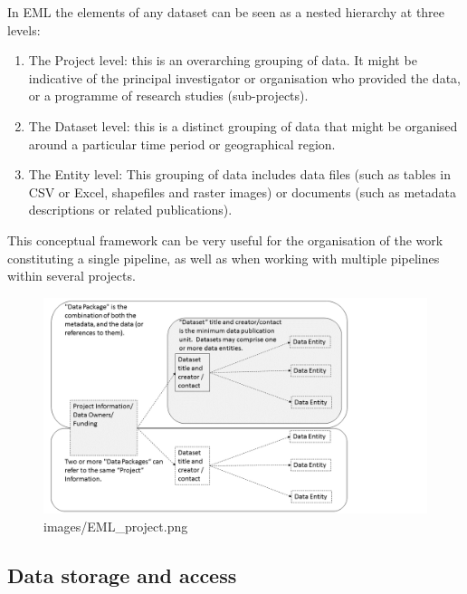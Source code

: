 \documentclass[11pt,a4paper]{article}
\begin{document}
In EML the elements of any dataset can be seen as a nested hierarchy at
three levels:

\begin{enumerate}
\def\labelenumi{\arabic{enumi}.}
\itemsep1pt\parskip0pt
\item
  The Project level: this is an overarching grouping of data. It might
  be indicative of the principal investigator or organisation who
  provided the data, or a programme of research studies (sub-projects).
\item
  The Dataset level: this is a distinct grouping of data that might be
  organised around a particular time period or geographical region.
\item
  The Entity level: This grouping of data includes data files (such as
  tables in CSV or Excel, shapefiles and raster images) or documents
  (such as metadata descriptions or related publications).
\end{enumerate}

This conceptual framework can be very useful for the organisation of the
work constituting a single pipeline, as well as when working with
multiple pipelines within several projects.

\begin{figure}[htbp]
\centering
\includegraphics{images/EML_project.png}
\caption{images/EML\_project.png}
\end{figure}

\subsection{Data storage and access}\label{data-storage-and-access}
\end{document}

